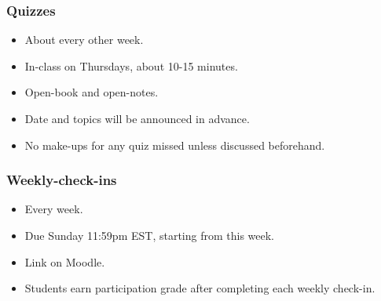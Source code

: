 \documentclass[slidestop,compress,mathserif]{beamer}
\begin{document}
\begin{frame}
\frametitle{Quizzes}

\begin{itemize}

\item About every other week.

\item In-class on Thursdays, about 10-15 minutes.

\item Open-book and open-notes.

\item Date and topics will be announced in advance.



\pause

\item No make-ups for any quiz missed unless discussed beforehand.
\pause


\end{itemize}

\end{frame}



\begin{frame}
\frametitle{Weekly-check-ins}

\begin{itemize}
\item Every week.

\item Due Sunday 11:59pm EST, starting from this week.

\item Link on Moodle.

\item Students earn participation grade after completing each weekly check-in.
\end{itemize}

\end{frame}

\end{document}
